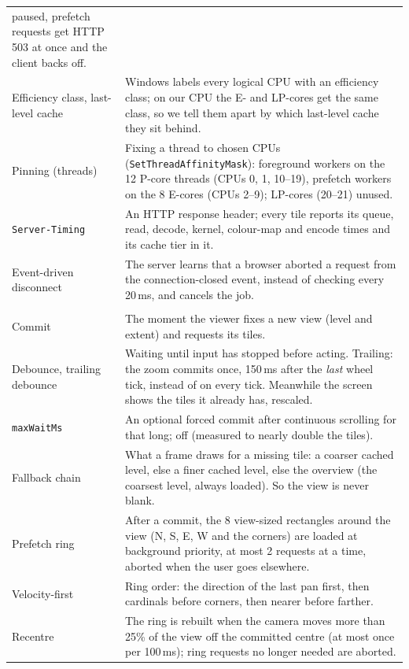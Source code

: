 ﻿\documentclass[11pt,a4paper]{article}
\newcommand{\code}[1]{\texttt{#1}}
\begin{document}
\begin{longtable}{>{\raggedright\arraybackslash}p{3.4cm}>{\raggedright\arraybackslash}p{12.0cm}}
paused, prefetch requests get HTTP 503 at once and the client backs off. \\
Efficiency class, last-level cache & Windows labels every logical CPU with an efficiency class; on our CPU the E-
and LP-cores get the same class, so we tell them apart by which last-level cache they sit behind. \\
Pinning (threads) & Fixing a thread to chosen CPUs (\code{SetThreadAffinityMask}): foreground workers on the 12
P-core threads (CPUs 0, 1, 10--19), prefetch workers on the 8 E-cores (CPUs 2--9); LP-cores (20--21) unused. \\
\code{Server-Timing} & An HTTP response header; every tile reports its queue, read, decode, kernel, colour-map and
encode times and its cache tier in it. \\
Event-driven disconnect & The server learns that a browser aborted a request from the connection-closed event,
instead of checking every 20\,ms, and cancels the job. \\
\midrule
\multicolumn{2}{l}{\textit{Phase 5: the viewer}} \\
Commit & The moment the viewer fixes a new view (level and extent) and requests its tiles. \\
Debounce, trailing debounce & Waiting until input has stopped before acting. Trailing: the zoom commits once,
150\,ms after the \emph{last} wheel tick, instead of on every tick. Meanwhile the screen shows the tiles it already
has, rescaled. \\
\code{maxWaitMs} & An optional forced commit after continuous scrolling for that long; off (measured to nearly double
the tiles). \\
Fallback chain & What a frame draws for a missing tile: a coarser cached level, else a finer cached level, else the
overview (the coarsest level, always loaded). So the view is never blank. \\
Prefetch ring & After a commit, the 8 view-sized rectangles around the view (N, S, E, W and the corners) are loaded at
background priority, at most 2 requests at a time, aborted when the user goes elsewhere. \\
Velocity-first & Ring order: the direction of the last pan first, then cardinals before corners, then nearer before
farther. \\
Recentre & The ring is rebuilt when the camera moves more than 25\% of the view off the committed centre (at most
once per 100\,ms); ring requests no longer needed are aborted. \\

\end{longtable}
\end{document}
